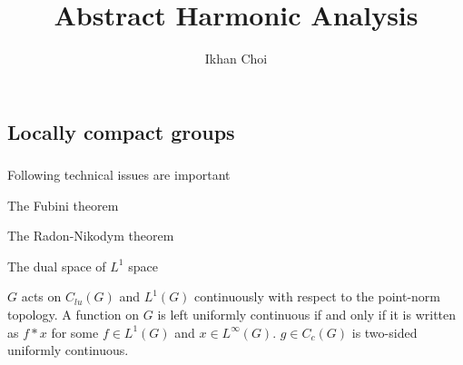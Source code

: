 \documentclass{../../large}
\begin{document}
\title{Abstract Harmonic Analysis}
\author{Ikhan Choi}
\maketitle
\tableofcontents



\part{}




\chapter{Locally compact groups}


\section{}

\begin{prb}
Following technical issues are important
\begin{parts}
\item The Fubini theorem
\item The Radon-Nikodym theorem
\item The dual space of $L^1$ space
\end{parts}
\end{prb}

\begin{prb}
\end{prb}

\begin{prb}
\end{prb}

\begin{prb}
\end{prb}

\begin{prb}
$G$ acts on $C_{lu}(G)$ and $L^1(G)$ continuously with respect to the point-norm topology.
A function on $G$ is left uniformly continuous if and only if it is written as $f*x$ for some $f\in L^1(G)$ and $x\in L^\infty(G)$.
$g\in C_c(G)$ is two-sided uniformly continuous.
\end{prb}
\end{document}
